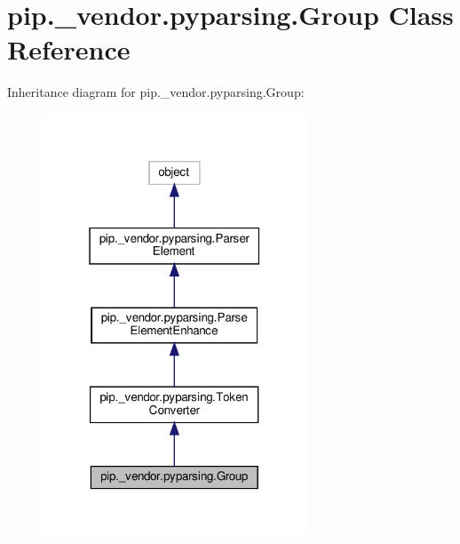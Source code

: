 \hypertarget{classpip_1_1__vendor_1_1pyparsing_1_1Group}{}\section{pip.\+\_\+vendor.\+pyparsing.\+Group Class Reference}
\label{classpip_1_1__vendor_1_1pyparsing_1_1Group}


Inheritance diagram for pip.\+\_\+vendor.\+pyparsing.\+Group\+:
\nopagebreak
\begin{figure}[H]
\begin{center}
\leavevmode
\includegraphics[width=223pt]{classpip_1_1__vendor_1_1pyparsing_1_1Group__inherit__graph}
\end{center}
\end{figure}


